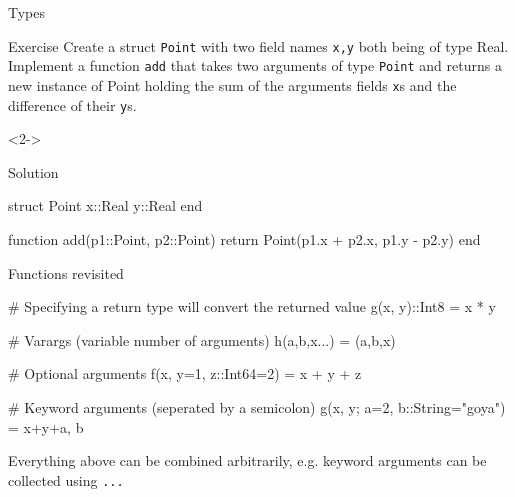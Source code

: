 \documentclass{beamer}
\newenvironment{Boxx}{\begin{tcolorbox}[standard jigsaw, opacityframe=0.8, opacityback=0.0]}{\end{tcolorbox}}
\begin{document}
\begin{frame}[fragile]{Types}
	\begin{overlayarea}{\linewidth}{9cm}
	\begin{block}{Exercise}
		Create a struct \verb|Point| with two field names \verb|x,y| both being of type Real. Implement a function \verb|add| that takes two arguments of type \verb|Point| and returns a new instance of Point holding the sum of the arguments fields \verb|x|s and the difference of their \verb|y|s.
	\end{block}
	\vfill
	\begin{onlyenv}<2->
	\begin{block}{Solution}
			\vspace*{1mm}
		\begin{jllisting}
  struct Point
    x::Real
    y::Real
  end
  
  function add(p1::Point, p2::Point)
    return Point(p1.x + p2.x, p1.y - p2.y)
  end
		\end{jllisting}
		\vspace*{1mm}
	\end{block}
\end{onlyenv}
\end{overlayarea}
\end{frame}

\begin{frame}[fragile]{Functions revisited}

	\begin{Boxx}
		\begin{jllisting}
  # Specifying a return type will convert the returned value	
  g(x, y)::Int8 = x * y
  
  # Varargs (variable number of arguments)
  h(a,b,x...) = (a,b,x)
  
  # Optional arguments
  f(x, y=1, z::Int64=2) = x + y + z
  
  # Keyword arguments (seperated by a semicolon)
  g(x, y; a=2, b::String="goya") = x+y+a, b
		\end{jllisting}
	\end{Boxx}
Everything above can be combined arbitrarily, e.g. keyword arguments can be collected using \verb|...|

	
\end{frame}
\end{document}
